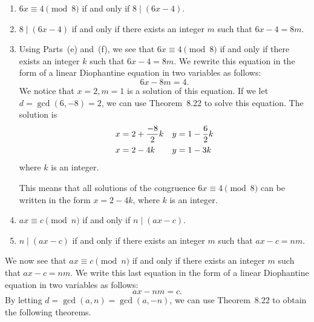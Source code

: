 \documentclass[11pt]{article}
\begin{document}
\begin{enumerate}
\item $6x \equiv 4 \pmod 8$ if and only if  $8 \mid \left( {6x-4} \right)$.

\item $8 \mid \left( {6x-4} \right)$ if and only if there exists an integer $m$ such that 
$6x - 4 = 8m$.

\item Using Parts~(e) and~(f), we see that $6x \equiv 4 \pmod 8$ if and only if there exists an integer $k$ such that $6x - 4 = 8m$.  We rewrite this equation in the form of a linear Diophantine equation in two variables as follows:
\[
6x - 8m = 4.
\]
We notice that $x = 2, m = 1$ is a solution of this equation.  If we let 
$d = \gcd \left( {6,-8} \right) = 2$, we can use Theorem~8.22 to solve this equation.  The solution is
\begin{align}
x &= 2 + \frac{-8}{2} k & y &= 1 - \frac{6}{2} k \notag \\
x &= 2 -4k              & y &= 1 - 3k     \notag  
\end{align}
where $k$ is an integer.

This means that all solutions of the congruence $6x \equiv 4 \pmod 8$ can be written in the form 
$x = 2 - 4k$, where $k$ is an integer.

\item $ax \equiv c \pmod n$ if and only if  $n \mid \left( {ax-c} \right)$.

\item $n \mid \left( {ax-c} \right)$ if and only if there exists an integer $m$ such that 
$ax - c = nm$.
\end{enumerate}

We now see that $ax \equiv c \pmod n$ if and only if there exists an integer $m$ such that 
$ax - c = nm$.  We write this last equation in the form of a linear Diophantine equation in two variables as follows:
\[
ax - nm = c.
\]
By letting $d = \gcd \left( {a,n} \right) = \gcd \left( {a,-n} \right)$, we can use Theorem~8.22 to obtain the following theorems.
\end{document}
